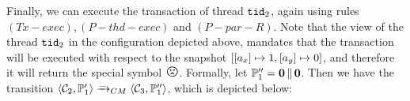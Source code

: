 \documentclass[a4paper,UKenglish]{article}%
\theoremstyle{plain}
\begin{document}
\begin{center}
\end{center}

Finally, we can execute the transaction of thread $\mathtt{tid}_2$, again using rules 
$(Tx-exec), (P-thd-exec)$ and $(P-par-R)$. Note that the view of the thread $\mathtt{tid}_2$ in the 
configuration depicted above, mandates that the transaction will be executed with 
respect to the snapshot $[ [a_x] \mapsto 1, [a_y] \mapsto 0]$, and therefore it will 
return the special symbol ${\Large \frownie{}}$. Formally, let $\mathbb{P}_1'' = \mathbf{0} \mathop{\lVert} \mathbf{0}$. 
Then we have the transition $\langle \mathcal{C}_2, \mathbb{P}_1' \rangle \xrightarrow{\_}_{CM} 
\langle \mathcal{C}_3, \mathbb{P}_1'' \rangle$, which is depicted below: 
\end{document}
